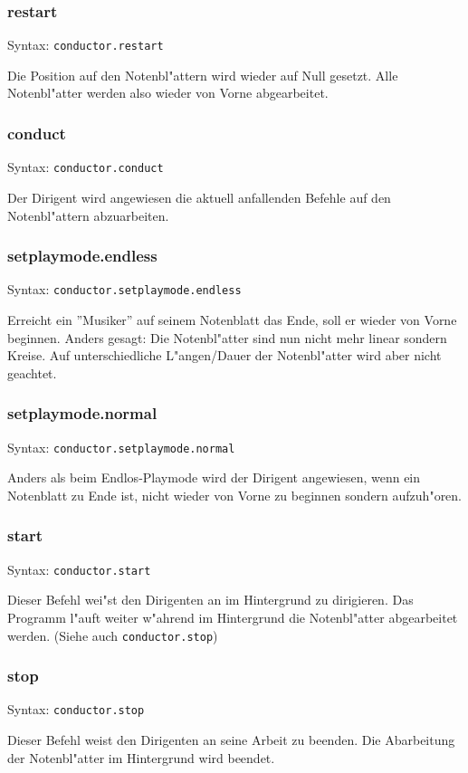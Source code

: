 \subsubsection{restart}
Syntax: \lstinline|conductor.restart|

Die Position auf den Notenbl"attern wird wieder auf Null gesetzt. Alle Notenbl"atter
werden also wieder von Vorne abgearbeitet. 
\subsubsection{conduct}
Syntax: \lstinline|conductor.conduct|

Der Dirigent wird angewiesen die aktuell anfallenden Befehle auf den Notenbl"attern
abzuarbeiten. 

\subsubsection{setplaymode.endless}
Syntax: \lstinline|conductor.setplaymode.endless|

Erreicht ein ''Musiker'' auf seinem Notenblatt das Ende, soll er wieder von 
Vorne beginnen. Anders gesagt: Die Notenbl"atter sind nun nicht mehr linear
sondern Kreise. Auf unterschiedliche L"angen/Dauer der Notenbl"atter wird aber
nicht geachtet. 

\subsubsection{setplaymode.normal}
Syntax: \lstinline|conductor.setplaymode.normal|

Anders als beim Endlos-Playmode wird der Dirigent angewiesen, wenn ein Notenblatt
zu Ende ist, nicht wieder von Vorne zu beginnen sondern aufzuh"oren. 
\subsubsection{start}
Syntax: \lstinline|conductor.start|

Dieser Befehl wei"st den Dirigenten an im Hintergrund zu dirigieren. Das Programm
l"auft weiter w"ahrend im Hintergrund die Notenbl"atter abgearbeitet werden. 
(Siehe auch \lstinline|conductor.stop|)
\subsubsection{stop}
Syntax: \lstinline|conductor.stop|

Dieser Befehl weist den Dirigenten an seine Arbeit zu beenden. Die Abarbeitung
der Notenbl"atter im Hintergrund wird beendet. 
